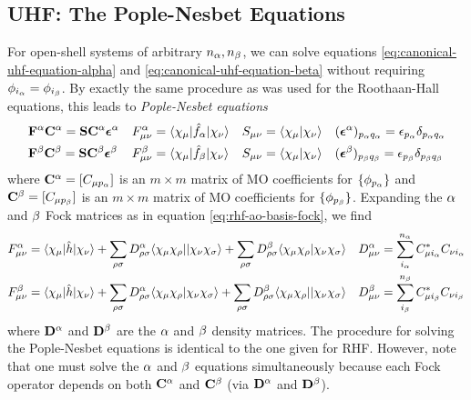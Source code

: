 \documentclass[11pt]{article}
\numberwithin{equation}{section}
\begin{document}
\subsection{UHF: The Pople-Nesbet Equations}

For open-shell systems of arbitrary $n_{\alpha }, n_{\beta }$, we can solve equations \ref{eq:canonical-uhf-equation-alpha} and \ref{eq:canonical-uhf-equation-beta} without requiring $\phi _{i_{\alpha }}=\phi _{i_{\beta }}$.
By exactly the same procedure as was used for the Roothaan-Hall equations, this leads to \textit{Pople-Nesbet equations}
\begin{align*}
&
  \bo{F}^\a\bo{C}^\a
=
  \bo{S}\bo{C}^\a\bm\ev^\a
&&
  F_{\mu\nu}^\a
=
  \ip{\x_\mu|\op{f}_\a|\x_\nu}
&&
  S_{\mu\nu}
=
  \ip{\x_\mu|\x_\nu}
&&
  (\bm\ev^\a)_{p_\a q_\a}
=
  \ev_{p_\a}\d_{p_\a q_\a}
\\
&
  \bo{F}^\b\bo{C}^\b
=
  \bo{S}\bo{C}^\b\bm\ev^\b
&&
  F_{\mu\nu}^\b
=
  \ip{\x_\mu|\op{f}_\b|\x_\nu}
&&
  S_{\mu\nu}
=
  \ip{\x_\mu|\x_\nu}
&&
  (\bm\ev^\b)_{p_\b q_\b}
=
  \ev_{p_\b}\d_{p_\b q_\b}
\end{align*}
where $\bo{C}^\a=[C_{\mu p_\a}]$ is an $m\times m$ matrix of MO coefficients for $\{\phi _{p_{\alpha }}\}$ and $\bo{C}^\b=[C_{\mu p_\b}]$ is an $m\times m$ matrix of MO coefficients for $\{\phi _{p_{\beta }}\}$.
Expanding the $\alpha $ and $\beta $ Fock matrices as in equation \ref{eq:rhf-ao-basis-fock}, we find
\begin{align*}
&
  F_{\mu\nu}^\a
=
  \ip{\x_\mu|\op{h}|\x_\nu}
+
  \sum_{\rho\si}
  D_{\rho\si}^\a
  \ip{\x_\mu\x_\rho||\x_\nu\x_\si}
+
  \sum_{\rho\si}
  D_{\rho\si}^\b
  \ip{\x_\mu\x_\rho|\x_\nu\x_\si}
&&
  D_{\mu\nu}^\a
=
  \sum_{i_\a}^{n_\a} C_{\mu i_\a}^*C_{\nu i_\a}
\\
&
  F_{\mu\nu}^\b
=
  \ip{\x_\mu|\op{h}|\x_\nu}
+
  \sum_{\rho\si}
  D_{\rho\si}^\a
  \ip{\x_\mu\x_\rho|\x_\nu\x_\si}
+
  \sum_{\rho\si}
  D_{\rho\si}^\b
  \ip{\x_\mu\x_\rho||\x_\nu\x_\si}
&&
  D_{\mu\nu}^\b
=
  \sum_{i_\b}^{n_\b} C_{\mu i_\b}^*C_{\nu i_\b}
\end{align*}
where $\mathbf{D}^{\alpha }$ and $\mathbf{D}^{\beta }$ are the $\alpha $ and $\beta $ density matrices.
The procedure for solving the Pople-Nesbet equations is identical to the one given for RHF.
However, note that one must solve the $\alpha $ and $\beta $ equations simultaneously because each Fock operator depends on both $\mathbf{C}^{\alpha }$ and $\mathbf{C}^{\beta }$ (via $\mathbf{D}^{\alpha }$ and $\mathbf{D}^{\beta }$).
\end{document}
